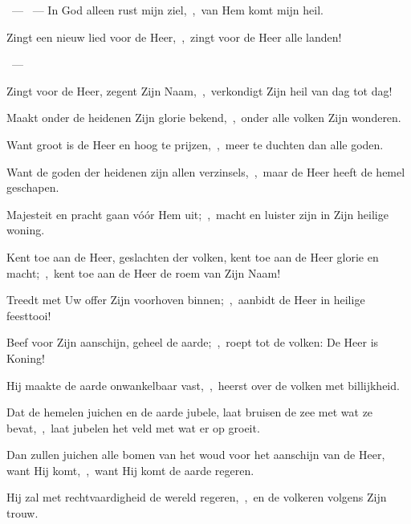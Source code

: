 \documentclass[12pt,twoside,a5paper]{article}
\begin{document}
\begin{halfparskip}
  ~--- ~---  In God alleen rust mijn ziel,~\sep\ van Hem komt mijn heil.
\end{halfparskip}


\begin{halfparskip}
   Zingt een nieuw lied voor de Heer,~\sep\ zingt voor de Heer alle landen!

  ~--- 

  Zingt voor de Heer, zegent Zijn Naam,~\sep\ verkondigt Zijn heil van dag tot dag!

  Maakt onder de heidenen Zijn glorie bekend,~\sep\ onder alle volken Zijn wonderen.

  Want groot is de Heer en hoog te prijzen,~\sep\ meer te duchten dan alle goden.

  Want de goden der heidenen zijn allen verzinsels,~\sep\ maar de Heer heeft de hemel geschapen.

  Majesteit en pracht gaan vóór Hem uit;~\sep\ macht en luister zijn in Zijn heilige woning.

  Kent toe aan de Heer, geslachten der volken, kent toe aan de Heer glorie en macht;~\sep\ kent toe aan de Heer de roem van Zijn Naam!

  Treedt met Uw offer Zijn voorhoven binnen;~\sep\ aanbidt de Heer in heilige feesttooi!

  Beef voor Zijn aanschijn, geheel de aarde;~\sep\ roept tot de volken: De Heer is Koning!

  Hij maakte de aarde onwankelbaar vast,~\sep\ heerst over de volken met billijkheid.

  Dat de hemelen juichen en de aarde jubele, laat bruisen de zee met wat ze bevat,~\sep\ laat jubelen het veld met wat er op groeit.

  Dan zullen juichen alle bomen van het woud voor het aanschijn van de Heer, want Hij komt,~\sep\ want Hij komt de aarde regeren.

  Hij zal met rechtvaardigheid de wereld regeren,~\sep\ en de volkeren volgens Zijn trouw.
\end{halfparskip}
\end{document}

